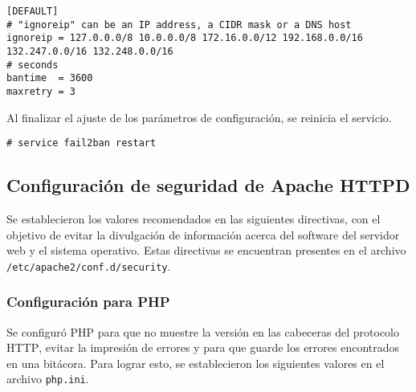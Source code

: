 {
\scriptsize
\linespread{1}
\begin{verbatim}
[DEFAULT]
# "ignoreip" can be an IP address, a CIDR mask or a DNS host
ignoreip = 127.0.0.0/8 10.0.0.0/8 172.16.0.0/12 192.168.0.0/16 132.247.0.0/16 132.248.0.0/16
# seconds
bantime  = 3600
maxretry = 3
\end{verbatim}
}

Al finalizar el ajuste de los par\'{a}metros de configuraci\'{o}n, se reinicia el servicio.

{
\scriptsize
\linespread{1}
\begin{verbatim}
# service fail2ban restart
\end{verbatim}
}

      \subsection {Configuraci\'{o}n de seguridad de Apache HTTPD}

Se establecieron los valores recomendados en las siguientes directivas, con el objetivo de evitar la divulgaci\'{o}n de informaci\'{o}n acerca del software del servidor web y el sistema operativo. Estas directivas se encuentran presentes en el archivo \texttt{/etc/apache2/conf.d/security}.

{
 \begin{table}[H]
 \caption{Directivas de seguridad de Apache \textsc{HTTPD}}{}
 \label{tab:apache-hardening}
 \noindent{} %
 \end{table}
}

        \subsubsection{Configuraci\'{o}n para \textsc{PHP}}

Se configur\'{o} \textsc{PHP} para que no muestre la versi\'{o}n en las cabeceras del protocolo \textsc{HTTP}, evitar la impresi\'{o}n de errores y para que guarde los errores encontrados en una bit\'{a}cora. Para lograr esto, se establecieron los siguientes valores en el archivo \texttt{php.ini}.

